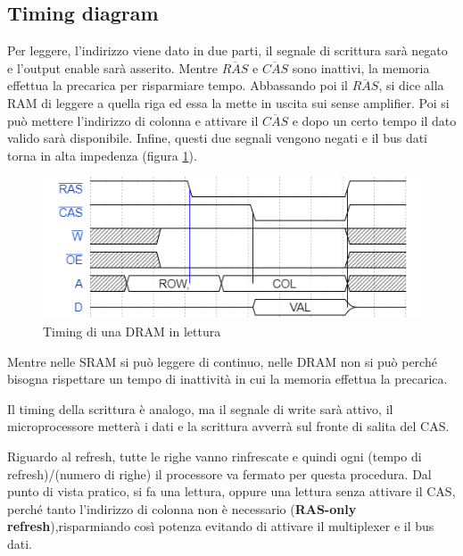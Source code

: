 \documentclass[11pt,4paper]{report}
\begin{document}
\subsection{Timing diagram}
Per leggere, l'indirizzo viene dato in due parti, il segnale di scrittura sarà negato e l'output enable sarà asserito.
Mentre $\overline{RAS}$ e $\overline{CAS}$ sono inattivi, la memoria effettua la precarica per risparmiare tempo. Abbassando poi il $\overline{RAS}$, si dice alla RAM di leggere a quella riga ed essa la mette in uscita sui sense amplifier. Poi si può mettere l'indirizzo di colonna e attivare il $\overline{CAS}$ e dopo un certo tempo il dato valido sarà disponibile. Infine, questi due segnali vengono negati e il bus dati torna in alta impedenza (figura \ref{fig:dram_read_time}).
\begin{figure}[H]
	\centering
	\includegraphics[width=0.7\linewidth]{memorie/dram_read_time.png}
	\caption{Timing di una DRAM in lettura}
	\label{fig:dram_read_time}
\end{figure}


Mentre nelle SRAM si può leggere di continuo, nelle DRAM non si può perché bisogna rispettare un tempo di inattività in cui la memoria effettua la precarica.

Il timing della scrittura è analogo, ma il segnale di write sarà attivo, il microprocessore metterà i dati e la scrittura avverrà sul fronte di salita del CAS.

Riguardo al refresh, tutte le righe vanno rinfrescate e quindi ogni (tempo di refresh)/(numero di righe) il processore va fermato per questa procedura. Dal punto di vista pratico, si fa una lettura, oppure una lettura senza attivare il CAS, perché tanto l'indirizzo di colonna non è necessario (\textbf{RAS-only refresh}),risparmiando così potenza evitando di attivare il multiplexer e il bus dati.
\end{document}
